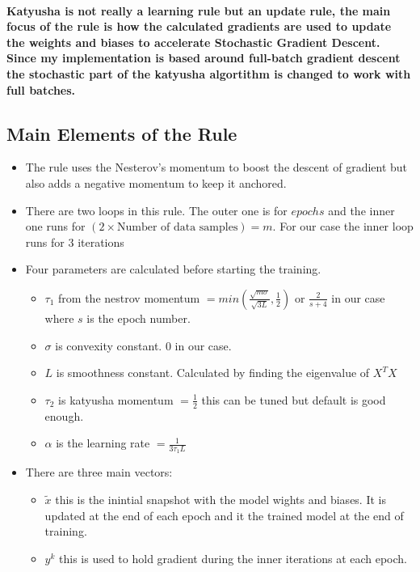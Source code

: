 \documentclass[../main.tex]{subfiles}
\begin{document}
\paragraph{Katyusha is not really a learning rule but an update rule, the main focus of the
rule is how the calculated gradients are used to update the weights and biases
to accelerate Stochastic Gradient Descent. \\
Since my implementation is based around full-batch gradient descent the stochastic part of the katyusha algortithm is changed to work with full batches.}
\subsection{Main Elements of the Rule}
\begin{itemize}
  \item The rule uses the Nesterov’s momentum to boost the descent of gradient but also adds a negative momentum to keep it anchored.
  \item There are two loops in this rule. The outer one is for $epochs$ and the inner one runs for $(2 \times \text{Number of data samples}) = m$. For our case the inner loop runs for 3 iterations
  \item Four parameters are calculated before starting the training.
    \begin{itemize}
            \item $\tau_{1}$ from the nestrov momentum $ = min{\left(\frac{\sqrt{m\sigma}}{\sqrt{3L}}, \frac{1}{2}\right)}$ or $\frac{2}{s+4}$ in our case where $s$ is the epoch number.
\item $\sigma$ is convexity constant. $0$ in our case.
\item $L$ is smoothness constant. Calculated by finding the eigenvalue of $X^{T}X$
\item $\tau_{2}$ is katyusha momentum $ = \frac{1}{2}$ this can be tuned but default is good enough.
\item $\alpha$ is the learning rate $ = \frac{1}{3\tau_{1}L}$
    \end{itemize}
      \item There are three main vectors:
    \begin{itemize}
      \item $\tilde{x}$ this is the inintial snapshot with the model wights and biases. It is updated at the end of each epoch and it the trained model at the end of training.
      \item $y^{k}$ this is used to hold gradient during the inner iterations at each epoch.

\end{itemize}
\end{itemize}
\end{document}
